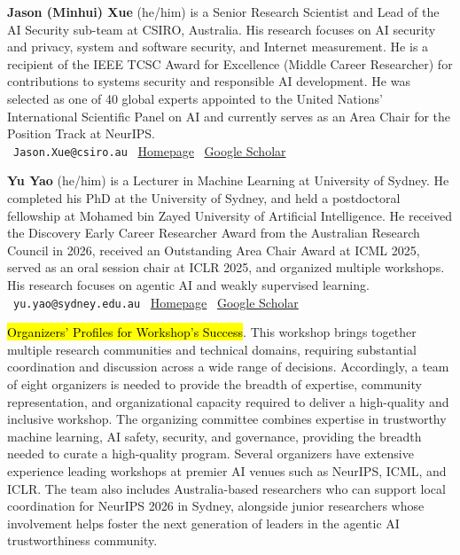 \documentclass{article}
\newcommand{\orginfo}[3]{\\{\small\faEnvelope\ \texttt{#1} \hfill \faHome\ \href{https://#2}{Homepage} \hfill \faGraduationCap\ \href{https://scholar.google.com/citations?user=#3}{Google Scholar}}}
\begin{document}
\textbf{Jason (Minhui) Xue} (he/him) is a Senior Research Scientist and Lead of the AI Security sub-team at CSIRO, Australia. His research focuses on AI security and privacy, system and software security, and Internet measurement. He is a recipient of the IEEE TCSC Award for Excellence (Middle Career Researcher) for contributions to systems security and responsible AI development. He was selected as one of 40 global experts appointed to the United Nations’ International Scientific Panel on AI and currently serves as an Area Chair for the Position Track at NeurIPS.
\orginfo{Jason.Xue@csiro.au}{https://minhui-xue.github.io/}{[jdqkm1IAAAAJ]}

\textbf{Yu Yao} (he/him) is a Lecturer in Machine Learning at University of Sydney. He completed his PhD at the University of Sydney, and held a postdoctoral fellowship at Mohamed bin Zayed University of Artificial Intelligence. He received the Discovery Early Career Researcher Award from the Australian Research Council in 2026, received an Outstanding Area Chair Award at ICML 2025, served as an oral session chair at ICLR 2025, and organized multiple workshops. His research focuses on agentic AI and weakly supervised learning.
\orginfo{yu.yao@sydney.edu.au}{a5507203.github.io}{OkcaMKAAAAAJ}


\hl{Organizers' Profiles for Workshop's Success}. This workshop brings together multiple research communities and technical domains, requiring substantial coordination and discussion across a wide range of decisions. Accordingly, a team of eight organizers is needed to provide the breadth of expertise, community representation, and organizational capacity required to deliver a high-quality and inclusive workshop. The organizing committee combines expertise in trustworthy machine learning, AI safety, security, and governance, providing the breadth needed to curate a high-quality program. Several organizers have extensive experience leading workshops at premier AI venues such as NeurIPS, ICML, and ICLR. The team also includes Australia-based researchers who can support local coordination for NeurIPS 2026 in Sydney, alongside junior researchers whose involvement helps foster the next generation of leaders in the agentic AI trustworthiness community.
\end{document}
